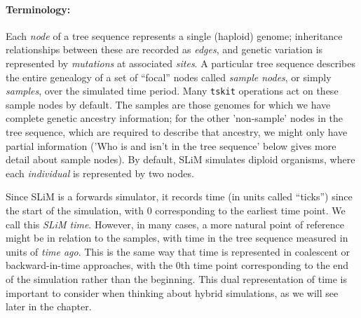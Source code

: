 \documentclass[12pt]{article}
\newcommand{\tskit}[0]{\texttt{tskit}\xspace}
\begin{document}
\paragraph{Terminology:}
Each \textit{node} of a tree sequence represents a single (haploid) genome;
inheritance relationships between these are recorded as \textit{edges},
and genetic variation is represented by \textit{mutations} at associated \textit{sites}.
A particular tree sequence describes the entire genealogy of a set of ``focal'' nodes called
\textit{sample nodes}, or simply \textit{samples}, over the simulated time period.
Many \tskit operations act on these sample nodes by default.
The samples are those genomes for which we have complete genetic ancestry information; for the other 'non-sample'
nodes in the tree sequence, which are required to describe that ancestry, we might only have partial information
('Who is and isn't in the tree sequence' below gives more detail about sample nodes).
By default, SLiM simulates diploid organisms, where each \textit{individual} is represented by two nodes.

Since SLiM is a forwards simulator, it records time (in units called ``ticks'')
since the start of the simulation, with 0 corresponding to the earliest time point.
We call this \textit{SLiM time}.
However, in many cases, a more natural point of reference might be in relation to the samples, with
time in the tree sequence measured in units of \textit{time ago}. This is the same way that time
is represented in coalescent or backward-in-time approaches, with the 0th time point corresponding
to the end of the simulation rather than the beginning. This dual representation of time is important
to consider when thinking about hybrid simulations, as we will see later in the chapter.
\end{document}

